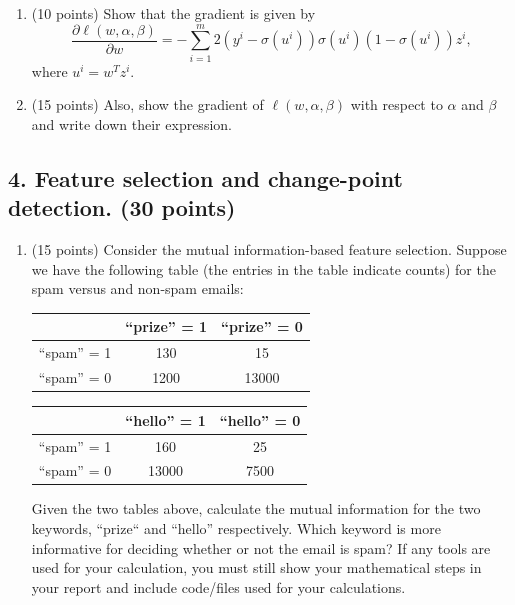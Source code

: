 \documentclass[12pt]{article}
\begin{document}
\begin{enumerate}
\item (10 points) Show that the gradient is given by
\[
\frac{\partial \ell(w, \alpha, \beta) }{\partial w}
= - \sum_{i=1}^m 2(y^i - \sigma(u^i))\sigma(u^i)(1-\sigma(u^i)) z^i,
\]
where $u^i = w^T z^i$. 
\item (15 points) Also, show the gradient of $\ell(w, \alpha, \beta)$ with respect to $\alpha$ and $\beta$ and write down their expression.
\end{enumerate}

\subsection*{4. Feature selection and change-point detection. (30 points)} 

\begin{enumerate}

\item (15 points) Consider the mutual information-based feature selection. Suppose we have the following table (the entries in the table indicate counts) for the spam versus and non-spam emails:
%
\begin{center}
\begin{tabular}{c|c|c}
\hline
& ``prize'' = 1 & ``prize'' = 0 \\\hline
``spam'' = 1 & 130& 15 \\ \hline 
 ``spam'' = 0 & 1200 & 13000  \\\hline
\end{tabular}
\end{center}

\begin{center}
\begin{tabular}{c|c|c}
\hline
& ``hello'' = 1 & ``hello'' = 0 \\\hline
``spam'' = 1 & 160 & 25 \\ \hline 
 ``spam'' = 0 & 13000 & 7500  \\\hline
\end{tabular}
\end{center}

Given the two tables above, calculate the mutual information for the two keywords, ``prize`` and ``hello'' respectively. Which keyword is more informative for deciding whether or not the email is spam? If any tools are used for your calculation, you must still show your mathematical steps in your report and include code/files used for your calculations.


\end{enumerate}
\end{document}
